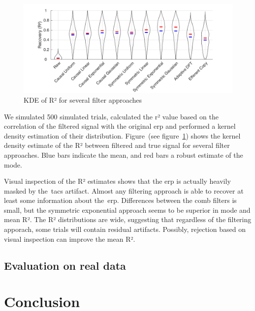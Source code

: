 \documentclass[a4paper]{article}
\newcommand{\figref}[1]{(see figure~\ref{#1})}
\begin{document}
\begin{figure}[hbtp]
    \includegraphics[width=\textwidth]{img/eva/recovery_erp.png}
    \caption{KDE of R² for several filter approaches}\label{fig:EvalOnErp}
\end{figure}

We simulated 500 simulated trials, calculated the r² value based on the correlation of the filtered signal with the original \gls{erp} and performed a kernel density estimation of their distribution. Figure~\figref{fig:EvalOnErp} shows the kernel density estimate of the R² between filtered and true signal for several filter approaches. Blue bars indicate the mean, and red bars a robust estimate of the mode.

Visual inspection of the R² estimates shows that the \gls{erp} is actually heavily masked by the~\gls{tacs} artifact.
Almost any filtering approach is able to recover at least some information about the~\gls{erp}. Differences between the comb filters is small, but the symmetric exponential approach seems to be superior in mode and mean R².
The R² distributions are wide, suggesting that regardless of the filtering apporach, some trials will contain residual artifacts. Possibly, rejection based on visual inspection can improve the mean R².

\subsection{Evaluation on real data}\label{sec:EvaluationData}

\section{Conclusion}



\end{document}
